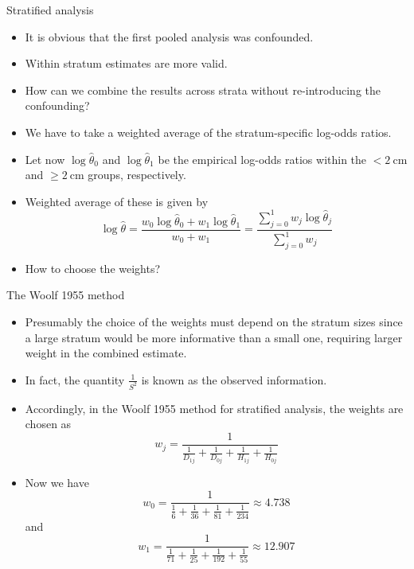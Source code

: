 \documentclass[10pt]{beamer}\usepackage[]{graphicx}\usepackage[]{color}
\begin{document}
\begin{frame}{Stratified analysis}
	\begin{itemize}
		\item It is obvious that the first pooled analysis was confounded.
		\item  Within stratum estimates are more valid.
		\item  How can we combine the results across strata without
		re-introducing the confounding?
		\item  We have to take a weighted average of the stratum-specific log-odds ratios.
		\item  Let now $\log \hat{\theta}_{0}$ and $\log \hat{\theta}_{1}$ be the empirical log-odds ratios within the $<2 \mathrm{~cm}$ and $\geq 2 \mathrm{~cm}$ groups, respectively.
		\item  Weighted average of these is given by
		$$
		\log \hat{\theta}=\frac{w_{0} \log \hat{\theta}_{0}+w_{1} \log \hat{\theta}_{1}}{w_{0}+w_{1}}=\frac{\sum_{j=0}^{1} w_{j} \log \hat{\theta}_{j}}{\sum_{j=0}^{1} w_{j}}
		$$
		\item  How to choose the weights?
	\end{itemize}
\end{frame}



\begin{frame}{The Woolf 1955 method}
	\begin{itemize}
		\item Presumably the choice of the weights must depend on the stratum sizes since a large stratum would be more informative than a small one, requiring larger weight in the combined estimate. 
		\item In fact, the quantity $\frac{1}{S^{2}}$ is known as the observed information.
		\item Accordingly, in the Woolf 1955 method for stratified analysis, the weights are chosen as
		$$
		w_{j}=\frac{1}{\frac{1}{D_{1 j}}+\frac{1}{D_{0 j}}+\frac{1}{H_{1 j}}+\frac{1}{H_{0 j}}}
		$$
		\item Now we have
		$$
		w_{0}=\frac{1}{\frac{1}{6}+\frac{1}{36}+\frac{1}{81}+\frac{1}{234}} \approx 4.738
		$$
		and
		$$
		w_{1}=\frac{1}{\frac{1}{71}+\frac{1}{25}+\frac{1}{192}+\frac{1}{55}} \approx 12.907
		$$
	\end{itemize}
\end{frame}
\end{document}

